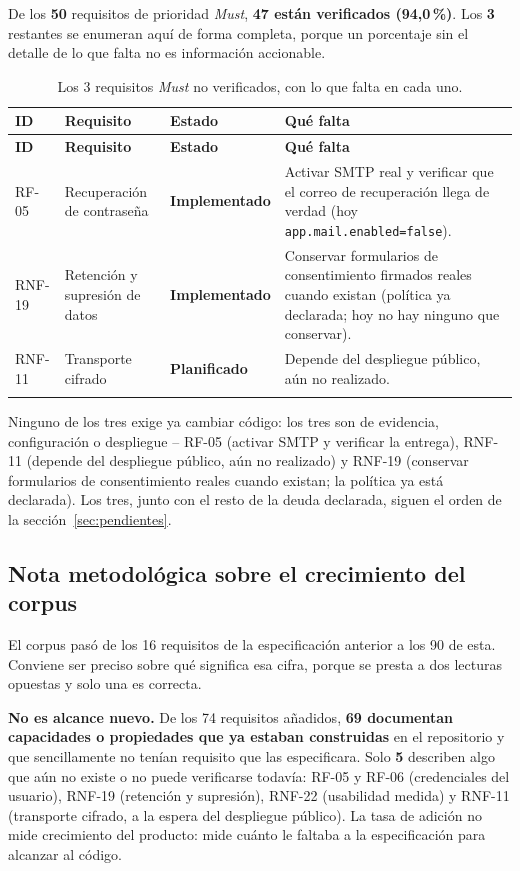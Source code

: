 \documentclass[11pt,a4paper]{article}
\newcommand{\estadoI}{\textcolor{ambar}{\textbf{Implementado}}}
\newcommand{\estadoP}{\textcolor{grisln}{\textbf{Planificado}}}
\begin{document}
De los \textbf{50} requisitos de prioridad \emph{Must}, \textbf{47 están verificados
(94,0\,\%)}. Los \textbf{3} restantes se enumeran aquí de forma completa, porque un porcentaje
sin el detalle de lo que falta no es información accionable.

\begin{longtable}{p{1.6cm} p{5.3cm} p{2.9cm} p{4.6cm}}
\toprule
\textbf{ID} & \textbf{Requisito} & \textbf{Estado} & \textbf{Qué falta} \\
\midrule
\endfirsthead
\toprule
\textbf{ID} & \textbf{Requisito} & \textbf{Estado} & \textbf{Qué falta} \\
\midrule
\endhead
RF-05 & Recuperación de contraseña & \estadoI & Activar SMTP real y verificar que el correo de
recuperación llega de verdad (hoy \texttt{app.mail.enabled=false}). \\
RNF-19 & Retención y supresión de datos & \estadoI & Conservar formularios de consentimiento
firmados reales cuando existan (política ya declarada; hoy no hay ninguno que conservar). \\
RNF-11 & Transporte cifrado & \estadoP & Depende del despliegue público, aún no realizado. \\
\bottomrule
\caption{Los 3 requisitos \emph{Must} no verificados, con lo que falta en cada uno.}
\end{longtable}

\noindent Ninguno de los tres exige ya cambiar código: los tres son de evidencia, configuración o
despliegue -- RF-05 (activar SMTP y verificar la entrega), RNF-11 (depende del despliegue
público, aún no realizado) y RNF-19 (conservar formularios de consentimiento reales cuando
existan; la política ya está declarada). Los tres, junto con el resto de la deuda declarada,
siguen el orden de la sección~\ref{sec:pendientes}.

\subsection{Nota metodológica sobre el crecimiento del corpus}

El corpus pasó de los 16 requisitos de la especificación anterior a los 90 de esta. Conviene ser preciso sobre
qué significa esa cifra, porque se presta a dos lecturas opuestas y solo una es correcta.

\textbf{No es alcance nuevo.} De los 74 requisitos añadidos, \textbf{69 documentan capacidades o
propiedades que ya estaban construidas} en el repositorio y que sencillamente no tenían requisito
que las especificara. Solo \textbf{5} describen algo que aún no existe o no puede verificarse
todavía: RF-05 y RF-06 (credenciales del usuario), RNF-19 (retención y supresión), RNF-22
(usabilidad medida) y RNF-11 (transporte cifrado, a la espera del despliegue público). La tasa de
adición no mide crecimiento del producto: mide cuánto le faltaba a la especificación para
alcanzar al código.
\end{document}

